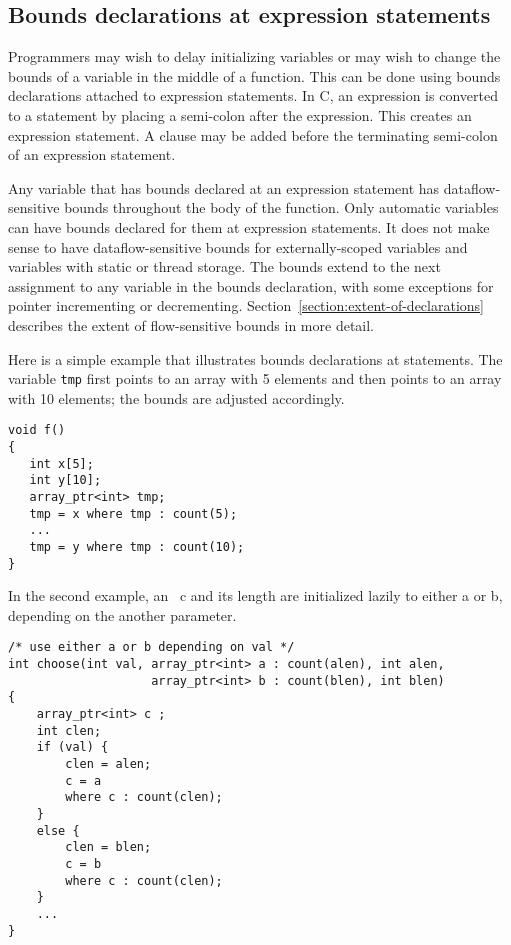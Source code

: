 \subsection{Bounds declarations at expression statements}
\label{section:statement-declarations}

Programmers may wish to delay initializing variables or may wish to
change the bounds of a variable in the middle of a function. This can be
done using bounds declarations attached to expression statements. In C,
an expression is converted to a statement by placing a semi-colon after
the expression. This creates an expression statement. A 
clause may be added before the terminating semi-colon of an expression
statement.

Any variable that has bounds declared at an expression statement has
dataflow-sensitive bounds throughout the body of the function. Only
automatic variables can have bounds declared for them at expression
statements. It does not make sense to have dataflow-sensitive bounds for
externally-scoped variables and variables with static or thread storage.
The bounds extend to the next assignment to any variable in the bounds
declaration, with some exceptions for pointer incrementing or
decrementing. Section~\ref{section:extent-of-declarations} 
describes the extent of flow-sensitive bounds
in more detail.

Here is a simple example that illustrates bounds declarations at
statements. The variable \texttt{tmp} first points to an array with 5
elements and then points to an array with 10 elements; the bounds are
adjusted accordingly.

\begin{verbatim}
void f() 
{
   int x[5];
   int y[10];
   array_ptr<int> tmp;
   tmp = x where tmp : count(5);
   ...
   tmp = y where tmp : count(10);
}
\end{verbatim}

In the second example, an \arrayptr\ c and its length are initialized
lazily to either a or b, depending on the another parameter.

\begin{verbatim}
/* use either a or b depending on val */
int choose(int val, array_ptr<int> a : count(alen), int alen,
                    array_ptr<int> b : count(blen), int blen) 
{
    array_ptr<int> c ;
    int clen;
    if (val) {
        clen = alen;
        c = a
        where c : count(clen);
    }
    else {
        clen = blen;
        c = b
        where c : count(clen);
    }    
    ...
}
\end{verbatim}

